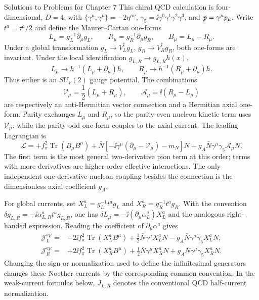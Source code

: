 \begin{bankssolutions}{Solutions to Problems for Chapter 7}
This chiral QCD calculation is four-dimensional, $D=4$, with
$\{\gamma^\mu,\gamma^\nu\}=-2\eta^{\mu\nu}$,
$\gamma_5=\ii\gamma^0\gamma^1\gamma^2\gamma^3$, and
$\slashed p=\gamma^\mu p_\mu$.  Write $t^a=\tau^a/2$ and define the
Maurer--Cartan one-forms
\[
 L_\mu=g_L^{-1}\partial_\mu g_L,\qquad
 R_\mu=g_R^{-1}\partial_\mu g_R,\qquad
 B_\mu=L_\mu-R_\mu.
\]
Under a global transformation
$g_L\to V_L^\dagger g_L$, $g_R\to V_R^\dagger g_R$, both one-forms are
invariant.  Under the local identification
$g_{L,R}\to g_{L,R}h(x)$,
\[
 L_\mu\longrightarrow h^{-1}(L_\mu+\partial_\mu)h,
 \qquad
 R_\mu\longrightarrow h^{-1}(R_\mu+\partial_\mu)h.
\]
Thus either is an $SU_V(2)$ gauge potential.  The combinations
\[
 \mathcal V_\mu=\frac12(L_\mu+R_\mu),\qquad
 \mathcal A_\mu=\ii(R_\mu-L_\mu)
\]
are respectively an anti-Hermitian vector connection and a Hermitian axial
one-form.  Parity exchanges $L_\mu$ and $R_\mu$, so the parity-even nucleon
kinetic term uses $\mathcal V_\mu$, while the parity-odd one-form couples to
the axial current.  The leading Lagrangian is
\begin{equation*}
 \mathcal L=
 +f_\pi^2\operatorname{Tr}(B_\mu B^\mu)
 +\bar N\left[-\ii\gamma^\mu(\partial_\mu-\mathcal V_\mu)-m_N\right]N
 +g_A\bar N\gamma^\mu\gamma_5\mathcal A_\mu N.
\end{equation*}
The first term is the most general two-derivative pion term at this order;
terms with more derivatives are higher-order effective interactions.  The
only independent one-derivative nucleon coupling besides the connection is
the dimensionless axial coefficient $g_A$.

For global currents, set
$X_L^a=g_L^{-1}t^ag_L$ and $X_R^a=g_R^{-1}t^ag_R$.  With the convention
$\delta g_{L,R}=-\ii\alpha_{L,R}^at^ag_{L,R}$, one has
$\delta L_\mu=-\ii(\partial_\mu\alpha_L^a)X_L^a$ and the analogous
right-handed expression.  Reading the coefficient of
$\partial_\mu\alpha^a$ gives
\begin{align*}
 \mathcal J_L^{a\mu}
 ={}&-2\ii f_\pi^2\operatorname{Tr}(X_L^aB^\mu)
 +\frac12\bar N\gamma^\mu X_L^aN
 -g_A\bar N\gamma^\mu\gamma_5X_L^aN,\\
 \mathcal J_R^{a\mu}
 ={}&+2\ii f_\pi^2\operatorname{Tr}(X_R^aB^\mu)
 +\frac12\bar N\gamma^\mu X_R^aN
 +g_A\bar N\gamma^\mu\gamma_5X_R^aN.
\end{align*}
Changing the sign or normalization used to define the infinitesimal
generators changes these Noether currents by the corresponding common
convention.  In the weak-current formulas below, $J_{L,R}$ denotes the
conventional QCD half-current normalization.


\end{bankssolutions}
